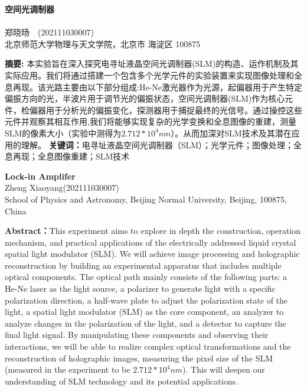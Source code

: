 \documentclass{whureport}
\newcommand{\name}{郑晓旸}
\newcommand{\stuid}{202111030007}
\newcommand{\Name}{Zheng Xiaoyang}
\newcommand{\newtitle}{空间光调制器}
\begin{document}
\pagestyle{maincontent} 


\begin{center}
 \textbf{\newtitle}\\
~\\
 \kaishu \name \ \ (\stuid)\\
 \kaishu 北京师范大学物理与天文学院，北京市 海淀区 100875\\
\end{center}
\textbf{摘\quad 要:}
本实验旨在深入探究电寻址液晶空间光调制器(SLM)的构造、运作机制及其实际应用。我们将通过搭建一个包含多个光学元件的实验装置来实现图像处理和全息再现。该光路主要由以下部分组成:He-Ne激光器作为光源，起偏器用于产生特定偏振方向的光，半波片用于调节光的偏振状态，空间光调制器(SLM)作为核心元件，检偏器用于分析光的偏振变化，探测器用于捕捉最终的光信号。通过操控这些元件并观察其相互作用,我们将能够实现复杂的光学变换和全息图像的重建，测量SLM的像素大小（实验中测得为$2.712*10^4nm$）。从而加深对SLM技术及其潜在应用的理解。
\textbf{关键词：}电寻址液晶空间光调制器（SLM）；光学元件；图像处理；全息再现；全息图像重建；SLM技术
~\\
\begin{center}
	 \textbf{Lock-in Amplifer}\\
	 \Name\quad (\stuid)\\
	 School of Physics and Astronomy, Beijing Normal University, Beijing, 100875, China
\end{center}

\textbf{Abstract：}This experiment aims to explore in depth the construction, operation mechanism, and practical applications of the electrically addressed liquid crystal spatial light modulator (SLM). We will achieve image processing and holographic reconstruction by building an experimental apparatus that includes multiple optical components. The optical path mainly consists of the following parts: a He-Ne laser as the light source, a polarizer to generate light with a specific polarization direction, a half-wave plate to adjust the polarization state of the light, a spatial light modulator (SLM) as the core component, an analyzer to analyze changes in the polarization of the light, and a detector to capture the final light signal. By manipulating these components and observing their interactions, we will be able to realize complex optical transformations and the reconstruction of holographic images, measuring the pixel size of the SLM (measured in the experiment to be $2.712*10^4 nm$). This will deepen our understanding of SLM technology and its potential applications.
\end{document}
